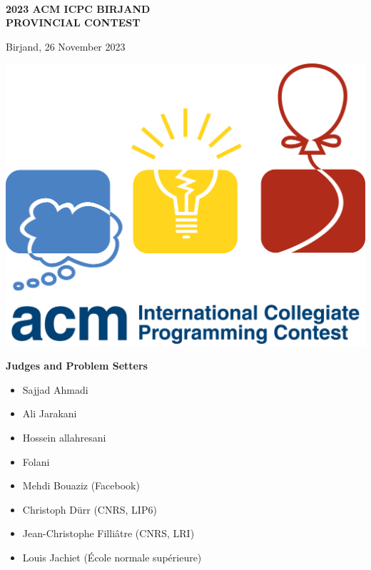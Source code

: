 
\begin{center}
	\huge
	
	\textbf{\sffamily ~\\2023 ACM ICPC BIRJAND\\PROVINCIAL CONTEST}
	
	\bigskip
	
	\textsf{Birjand, 26 November 2023}
	
	\bigskip\bigskip\bigskip
	
	\includegraphics[width=.5\linewidth]{icpc-logo.png}
	
	\bigskip\normalsize
	\vspace{1cm}
	\Large
	\textbf{Judges and Problem Setters}

\vspace{0.5cm}
\normalsize
\noindent\begin{minipage}{.5\linewidth}
		\begin{itemize}
			\item Sajjad Ahmadi
			\item Ali Jarakani
			\item Hossein allahresani
			\item Folani
		\end{itemize}
\end{minipage}%
\begin{minipage}{.5\linewidth}
		\begin{itemize}
			\item Mehdi Bouaziz (Facebook)
			\item Christoph Dürr (CNRS, LIP6)
			\item Jean-Christophe Filliâtre (CNRS, LRI)
			\item Louis Jachiet (École normale supérieure)
		\end{itemize}
\end{minipage}


\end{center}

